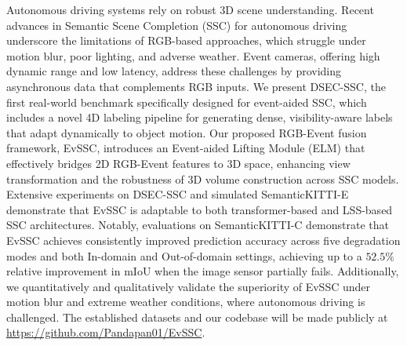 Autonomous driving systems rely on robust 3D scene understanding. Recent advances in Semantic Scene Completion (SSC) for autonomous driving underscore the limitations of RGB-based approaches, which struggle under motion blur, poor lighting, and adverse weather. Event cameras, offering high dynamic range and low latency, address these challenges by providing asynchronous data that complements RGB inputs. We present DSEC-SSC, the first real-world benchmark specifically designed for event-aided SSC, which includes a novel 4D labeling pipeline for generating dense, visibility-aware labels that adapt dynamically to object motion. Our proposed RGB-Event fusion framework, EvSSC, introduces an Event-aided Lifting Module (ELM) that effectively bridges 2D RGB-Event features to 3D space, enhancing view transformation and the robustness of 3D volume construction across SSC models. Extensive experiments on DSEC-SSC and simulated SemanticKITTI-E demonstrate that EvSSC is adaptable to both transformer-based and LSS-based SSC architectures. Notably, evaluations on SemanticKITTI-C demonstrate that EvSSC achieves consistently improved prediction accuracy across five degradation modes and both In-domain and Out-of-domain settings, achieving up to a $52.5\%$ relative improvement in mIoU when the image sensor partially fails. Additionally, we quantitatively and qualitatively validate the superiority of EvSSC under motion blur and extreme weather conditions, where autonomous driving is challenged. The established datasets and our codebase will be made publicly at \url{https://github.com/Pandapan01/EvSSC}.